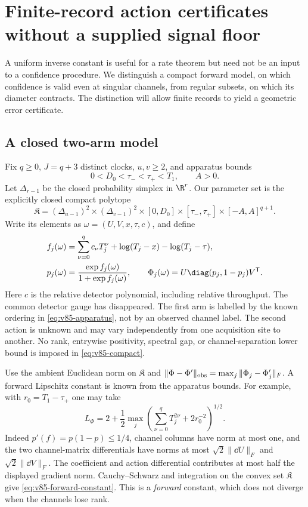 \section{Finite-record action certificates without a supplied signal floor}
\label{sec:v85-certificates}
A uniform inverse constant is useful for a rate theorem but need not be
an input to a confidence procedure. We distinguish a compact forward
model, on which confidence is valid even at singular channels, from
regular subsets, on which its diameter contracts. The distinction will
allow finite records to yield a geometric error certificate.

\subsection{A closed two-arm model}
Fix $q\ge0$, $J=q+3$ distinct clocks, $u,v\ge2$, and apparatus bounds
\begin{equation}\label{eq:v85-apparatus}
        0<D_0<\tau_-<\tau_+<T_1,\qquad A>0.
\end{equation}
Let $\Delta_{r-1}$ be the closed probability simplex in $\R^r$.
Our parameter set is the explicitly closed compact polytope
\begin{equation}\label{eq:v85-compact}
 \mathfrak K=(\Delta_{u-1})^2\times(\Delta_{v-1})^2
          \times[0,D_0]\times[\tau_-,\tau_+]
          \times[-A,A]^{q+1}.
\end{equation}
Write its elements as $\omega=(U,V,x,\tau,c)$, and define
\begin{align}
 f_j(\omega)&=\sum_{\nu=0}^q c_\nu T_j^\nu
                 +\log(T_j-x)-\log(T_j-\tau),\nonumber\\
 p_j(\omega)&=\frac{\exp f_j(\omega)}{1+\exp f_j(\omega)},\qquad
 \Phi_j(\omega)=U\diag(p_j,1-p_j)V^{\mathsf T}.
                                               \label{eq:v85-forward}
\end{align}
Here $c$ is the relative detector polynomial, including relative
throughput. The common detector gauge has disappeared. The first arm
is labelled by the known ordering in \eqref{eq:v85-apparatus}, not by
an observed channel label. The second action is unknown and may vary
independently from one acquisition site to another. No rank, entrywise
positivity, spectral gap, or channel-separation lower bound is imposed
in \eqref{eq:v85-compact}.

Use the ambient Euclidean norm on $\mathfrak K$ and
$\|\Phi-\Phi'\|_{\rm obs}=\max_j\|\Phi_j-\Phi'_j\|_F$.
A forward Lipschitz constant is known from the apparatus bounds. For
example, with $r_0=T_1-\tau_+$ one may take
\begin{equation}\label{eq:v85-forward-constant}
 L_\Phi=2+\frac12\max_j
        \left(\sum_{\nu=0}^qT_j^{2\nu}+2r_0^{-2}\right)^{1/2}.
\end{equation}
Indeed $p'(f)=p(1-p)\le1/4$, channel columns have norm at most one,
and the two channel-matrix differentials have norms at most
$\sqrt2\|\dd U\|_F$ and $\sqrt2\|\dd V\|_F$. The coefficient and
action differential contributes at most half the displayed gradient
norm. Cauchy--Schwarz and integration on the convex set
$\mathfrak K$ give \eqref{eq:v85-forward-constant}. This is a
\emph{forward} constant, which does not diverge when the channels lose
rank.

